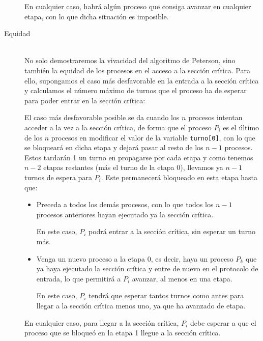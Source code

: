 \begin{description}
\begin{itemize}
\begin{itemize}
                \end{itemize}
        \end{itemize}
        En cualquier caso, habrá algún proceso que consiga avanzar en cualquier etapa, con lo que dicha situación es imposible.
    \item [Equidad]~\\
        No solo demostraremos la vivacidad del algoritmo de Peterson, sino también la equidad de los procesos en el acceso a la sección crítica. Para ello, supongamos el caso más desfavorable en la entrada a la sección crítica y calculamos el número máximo de turnos que el proceso ha de esperar para poder entrar en la sección crítica:

        El caso más desfavorable posible se da cuando los $n$ procesos intentan acceder a la vez a la sección crítica, de forma que el proceso $P_i$ es el último de los $n$ procesos en modificar el valor de la variable \verb|turno[0]|, con lo que se bloqueará en dicha etapa y dejará pasar al resto de los $n-1$ procesos. Estos tardarán 1 un turno en propagarse por cada etapa y como tenemos $n-2$ etapas restantes (más el turno de la etapa 0), llevamos ya $n-1$ turnos de espera para $P_i$. Este permanecerá bloqueado en esta etapa hasta que:
        \begin{itemize}
            \item Preceda a todos los demás procesos, con lo que todos los $n-1$ procesos anteriores hayan ejecutado ya la sección crítica.

                En este caso, $P_i$ podrá entrar a la sección crítica, sin esperar un turno más.
            \item Venga un nuevo proceso a la etapa 0, es decir, haya un proceso $P_k$ que ya haya ejecutado la sección crítica y entre de nuevo en el protocolo de entrada, lo que permitirá a $P_i$ avanzar, al menos en una etapa.

                En este caso, $P_i$ tendrá que esperar tantos turnos como antes para llegar a la sección crítica menos uno, ya que ha avanzado de etapa.
        \end{itemize}
        En cualquier caso, para llegar a la sección crítica, $P_i$ debe esperar a que el proceso que se bloqueó en la etapa 1 llegue a la sección crítica.


\end{description}
